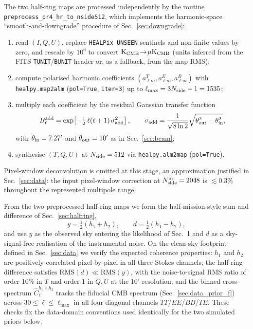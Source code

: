 \documentclass[11pt]{article}
\theoremstyle{definition}
\begin{document}
The two half-ring maps are processed independently by the routine \texttt{preprocess\_pr4\_hr\_to\_nside512}, which implements the harmonic-space ``smooth-and-downgrade'' procedure of Sec.~\ref{sec:downgrade}:
\begin{enumerate}[leftmargin=2.0em,itemsep=0.1em]
  \item read $(I,Q,U)$, replace \texttt{HEALPix UNSEEN} sentinels and non-finite values by zero, and rescale by $10^6$ to convert $\mathrm{K}_{\rm CMB}\!\to\!\mu\mathrm{K}_{\rm CMB}$ (units inferred from the FITS \texttt{TUNIT}/\texttt{BUNIT} header or, as a fallback, from the map RMS);
  \item compute polarised harmonic coefficients $(a^T_{\ell m},a^E_{\ell m},a^B_{\ell m})$ with \texttt{healpy.map2alm} (\texttt{pol=True}, \texttt{iter=3}) up to $\ell_{\max}=3N_{\rm side}-1=1535$;
  \item multiply each coefficient by the residual Gaussian transfer function
  \begin{equation}
    B^{\rm add}_\ell = \exp\!\left[-\tfrac12\,\ell(\ell+1)\,\sigma^2_{\rm add}\right],\qquad
    \sigma_{\rm add}=\frac{1}{\sqrt{8\ln 2}}\sqrt{\theta_{\rm out}^2-\theta_{\rm in}^2},
  \end{equation}
  with $\theta_{\rm in}=7.27'$ and $\theta_{\rm out}=10'$ as in Sec.~\ref{sec:beam};
  \item synthesise $(T,Q,U)$ at $N_{\rm side}=512$ via \texttt{healpy.alm2map} (\texttt{pol=True}).
\end{enumerate}
Pixel-window deconvolution is omitted at this stage, an approximation justified in Sec.~\ref{sec:data}: the input pixel-window correction at $N_{\rm side}^{\rm in}=2048$ is $\lesssim 0.3\%$ throughout the represented multipole range.

From the two preprocessed half-ring maps we form the half-mission-style sum and difference of Sec.~\ref{sec:halfring},
\begin{equation}
  y = \tfrac12(h_1+h_2),\qquad d = \tfrac12(h_1-h_2),
\end{equation}
and use $y$ as the observed sky entering the likelihood of Sec.~1 and $d$ as a sky-signal-free realisation of the instrumental noise. On the clean-sky footprint defined in Sec.~\ref{sec:data} we verify the expected coherence properties: $h_1$ and $h_2$ are positively correlated pixel-by-pixel in all three Stokes channels; the half-ring difference satisfies $\mathrm{RMS}(d)\!\ll\!\mathrm{RMS}(y)$, with the noise-to-signal RMS ratio of order $10\%$ in $T$ and order $1$ in $Q,U$ at the $10'$ resolution; and the binned cross-spectrum $\widehat C_\ell^{h_1\times h_2}$ tracks the fiducial CMB spectrum (Sec.~\ref{sec:data_prior_f}) across $30\!\le\!\ell\!\le\!\ell_{\max}$ in all four diagonal channels $TT$/$EE$/$BB$/$TE$. These checks fix the data-domain conventions used identically for the two simulated priors below.
\end{document}

